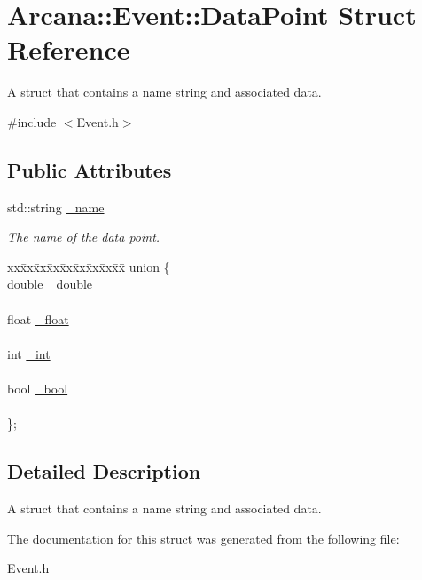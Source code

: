 \hypertarget{struct_arcana_1_1_event_1_1_data_point}{}\section{Arcana\+:\+:Event\+:\+:Data\+Point Struct Reference}
\label{struct_arcana_1_1_event_1_1_data_point}


A struct that contains a name string and associated data.  




{\ttfamily \#include $<$Event.\+h$>$}

\subsection*{Public Attributes}
\begin{DoxyCompactItemize}
\item 
\mbox{\label{struct_arcana_1_1_event_1_1_data_point_a783d241a0db80064fd902076c77509ce}} 
std\+::string \mbox{\hyperlink{struct_arcana_1_1_event_1_1_data_point_a783d241a0db80064fd902076c77509ce}{\+\_\+name}}
\begin{DoxyCompactList}\small\item\em The name of the data point. \end{DoxyCompactList}\item 
\mbox{\label{struct_arcana_1_1_event_1_1_data_point_a97ef64ae8e20b4b884a540eadf8f53e2}} 
\begin{tabbing}
xx\=xx\=xx\=xx\=xx\=xx\=xx\=xx\=xx\=\kill
union \{\\
\>double \mbox{\hyperlink{struct_arcana_1_1_event_1_1_data_point_a74be14f799c2adeffa2439e959141ca5}{\_double}}\\
\>\\
\>float \mbox{\hyperlink{struct_arcana_1_1_event_1_1_data_point_afeec2accb12d5842aa9b3ef2a0fbb5ca}{\_float}}\\
\>\\
\>int \mbox{\hyperlink{struct_arcana_1_1_event_1_1_data_point_ab58be27deb105b240277a102e25dbc8d}{\_int}}\\
\>\\
\>bool \mbox{\hyperlink{struct_arcana_1_1_event_1_1_data_point_a4c97bbd1d8eae9c99b36e24fc5004ac6}{\_bool}}\\
\>\\
\}; \\

\end{tabbing}\end{DoxyCompactItemize}


\subsection{Detailed Description}
A struct that contains a name string and associated data. 

The documentation for this struct was generated from the following file\+:\begin{DoxyCompactItemize}
\item 
Event.\+h\end{DoxyCompactItemize}
